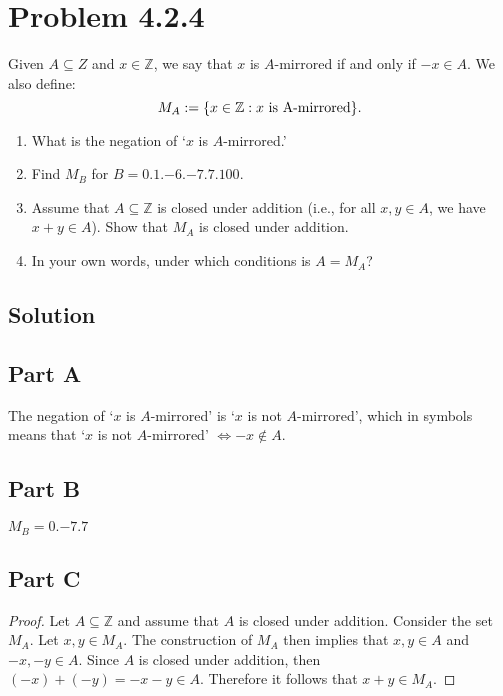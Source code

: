\documentclass[12pt]{extarticle}
\begin{document}
\section*{Problem 4.2.4}

Given $A \subseteq Z$ and $x \in \mathbb{Z}$, we say that $x$ is $A$-mirrored if and only if $-x \in A$. We also define: 
\[
  M_A := \qty{x \in \mathbb{Z} : x \text{ is A-mirrored}} 
.\]

\begin{enumerate}[label=(\alph*)]
	\item What is the negation of ‘$x$ is $A$-mirrored.’ 
	\item Find $M_B$ for $B = \qty{0, 1, -6, -7, 7, 100}$.
	\item Assume that $A \subseteq \mathbb{Z}$ is closed under addition (i.e., for all $x, y \in  A$, we have $x + y \in A$). Show that $M_A$ is closed under addition. 
	\item In your own words, under which conditions is $A = M_A$?
\end{enumerate}

\subsection*{Solution}

\subsection*{Part A}

The negation of ‘$x$ is $A$-mirrored’ is ‘$x$ is not $A$-mirrored’, which in symbols means that ‘$x$ is not $A$-mirrored’ $\Longleftrightarrow -x \notin A$.

\subsection*{Part B}

$M_B = \qty{0, -7, 7}$

\subsection*{Part C}

\begin{proof}
	Let $A \subseteq \mathbb{Z}$ and assume that $A$ is closed under addition. Consider the set $M_A$. Let $x,y \in M_A$. The construction of $M_A$ then implies that $x,y \in A$ and $-x,-y \in A$. Since $A$ is closed under addition, then $(-x) + (-y) = -x - y \in A$. Therefore it follows that $x + y \in M_A$.
\end{proof}
\end{document}
